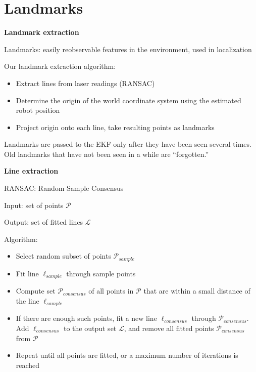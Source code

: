 \documentclass[xcolor=dvipsnames]{beamer}
\begin{document}
  \section{Landmarks}
  \begin{frame}{\bf Landmark extraction}

    Landmarks: easily reobservable features in the environment, used in
    localization

    Our landmark extraction algorithm:
    \begin{itemize}
    \item Extract lines from laser readings (RANSAC)
    \item Determine the origin of the world coordinate system using the
          estimated robot position
    \item Project origin onto each line, take resulting points as landmarks
    \end{itemize}
    \vspace{1cm}

    Landmarks are passed to the EKF only after they have been seen several
    times. Old landmarks that have not been seen in a while are ``forgotten.''
  \end{frame}

  \begin{frame}{\bf Line extraction}

    RANSAC: Random Sample Consensus

    Input: set of points $\mathcal{P}$

    Output: set of fitted lines $\mathcal{L}$

    Algorithm:
    \begin{itemize}
    \item Select random subset of points $\mathcal{P}_{sample}$
    \item Fit line $\ell_{sample}$ through sample points
    \item Compute set $\mathcal{P}_{consensus}$ of all points in $\mathcal{P}$
          that are within a small distance of the line $\ell_{sample}$
    \item If there are enough such points, fit a new line
          $\ell_{consensus}$ through $\mathcal{P}_{consensus}$.
          Add $\ell_{consensus}$ to the output set $\mathcal{L}$, and
          remove all fitted points $\mathcal{P}_{consensus}$ from $\mathcal{P}$
    \item Repeat until all points are fitted, or a maximum number of iterations
          is reached
    \end{itemize}
  \end{frame}
\end{document}
